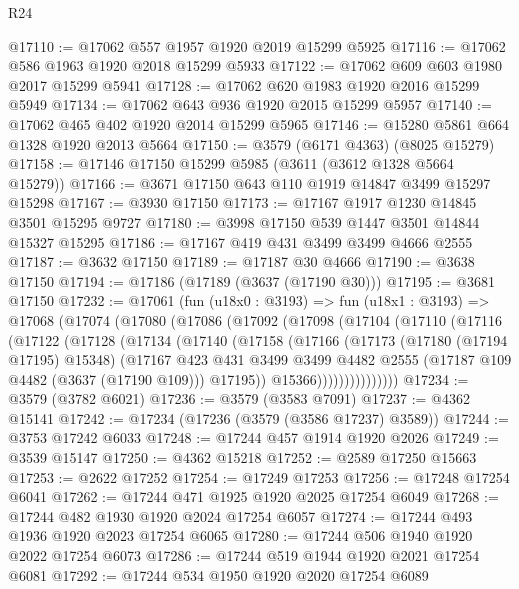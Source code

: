 \begin{lexlean}{R24}
\begin{coremodule}
@17110 := @17062 @557 @1957 @1920 @2019 @15299 @5925
@17116 := @17062 @586 @1963 @1920 @2018 @15299 @5933
@17122 := @17062 @609 @603 @1980 @2017 @15299 @5941
@17128 := @17062 @620 @1983 @1920 @2016 @15299 @5949
@17134 := @17062 @643 @936 @1920 @2015 @15299 @5957
@17140 := @17062 @465 @402 @1920 @2014 @15299 @5965
@17146 := @15280 @5861 @664 @1328 @1920 @2013 @5664
@17150 := @3579 (@6171 @4363) (@8025 @15279)
@17158 := @17146 @17150 @15299 @5985 (@3611 (@3612 @1328 @5664 @15279))
@17166 := @3671 @17150 @643 @110 @1919 @14847 @3499 @15297 @15298
@17167 := @3930 @17150
@17173 := @17167 @1917 @1230 @14845 @3501 @15295 @9727
@17180 := @3998 @17150 @539 @1447 @3501 @14844 @15327 @15295
@17186 := @17167 @419 @431 @3499 @3499 @4666 @2555
@17187 := @3632 @17150
@17189 := @17187 @30 @4666
@17190 := @3638 @17150
@17194 := @17186 (@17189 (@3637 (@17190 @30)))
@17195 := @3681 @17150
@17232 := @17061
    (fun (u18x0 : @3193) =>
    fun (u18x1 : @3193) =>
    @17068
      (@17074
        (@17080
          (@17086
            (@17092
              (@17098
                (@17104
                  (@17110
                    (@17116
                      (@17122
                        (@17128
                          (@17134
                            (@17140
                              (@17158
                                (@17166
                                  (@17173
                                    (@17180 (@17194 @17195) @15348)
                                    (@17167
                                      @423
                                      @431
                                      @3499
                                      @3499
                                      @4482
                                      @2555
                                      (@17187 @109 @4482 (@3637 (@17190 @109)))
                                      @17195))
                                  @15366)))))))))))))))
@17234 := @3579 (@3782 @6021)
@17236 := @3579 (@3583 @7091)
@17237 := @4362 @15141
@17242 := @17234 (@17236 (@3579 (@3586 @17237) @3589))
@17244 := @3753 @17242 @6033
@17248 := @17244 @457 @1914 @1920 @2026
@17249 := @3539 @15147
@17250 := @4362 @15218
@17252 := @2589 @17250 @15663
@17253 := @2622 @17252
@17254 := @17249 @17253
@17256 := @17248 @17254 @6041
@17262 := @17244 @471 @1925 @1920 @2025 @17254 @6049
@17268 := @17244 @482 @1930 @1920 @2024 @17254 @6057
@17274 := @17244 @493 @1936 @1920 @2023 @17254 @6065
@17280 := @17244 @506 @1940 @1920 @2022 @17254 @6073
@17286 := @17244 @519 @1944 @1920 @2021 @17254 @6081
@17292 := @17244 @534 @1950 @1920 @2020 @17254 @6089

\end{coremodule}
\end{lexlean}
